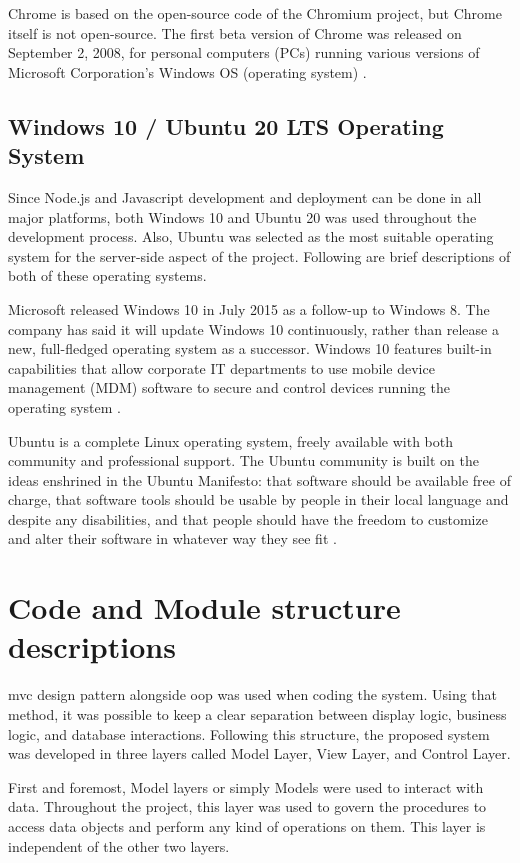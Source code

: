 \documentclass[12pt]{report}
\begin{document}
Chrome is based on the open-source code of the Chromium project, but Chrome itself is not open-source. The first beta version of Chrome was released on September 2, 2008, for personal computers (PCs) running various versions of Microsoft Corporation's Windows OS (operating system) \cite{hosch_2020_google_chrome}.

\subsection{Windows 10 / Ubuntu 20 LTS Operating System}
Since Node.js and Javascript development and deployment can be done in all major platforms, both Windows 10 and Ubuntu 20 was used throughout the development process. Also, Ubuntu was selected as the most suitable operating system for the server-side aspect of the project. Following are brief descriptions of both of these operating systems.

Microsoft released Windows 10 in July 2015 as a follow-up to Windows 8. The company has said it will update Windows 10 continuously, rather than release a new, full-fledged operating system as a successor. Windows 10 features built-in capabilities that allow corporate IT departments to use mobile device management (MDM) software to secure and control devices running the operating system \cite{margaretrouse_2017_windows10}.

Ubuntu is a complete Linux operating system, freely available with both community and professional support. The Ubuntu community is built on the ideas enshrined in the Ubuntu Manifesto: that software should be available free of charge, that software tools should be usable by people in their local language and despite any disabilities, and that people should have the freedom to customize and alter their software in whatever way they see fit \cite{ubuntu_2019_introduction}.


\section{Code and Module structure descriptions}
\acrshort{mvc} design pattern alongside \acrshort{oop} was used when coding the system. Using that method, it was possible to keep a clear separation between display logic, business logic, and database interactions. Following this structure, the proposed system was developed in three layers called Model Layer, View Layer, and Control Layer.

First and foremost, Model layers or simply Models were used to interact with data. Throughout the project, this layer was used to govern the procedures to access data objects and perform any kind of operations on them. This layer is independent of the other two layers.
\end{document}
